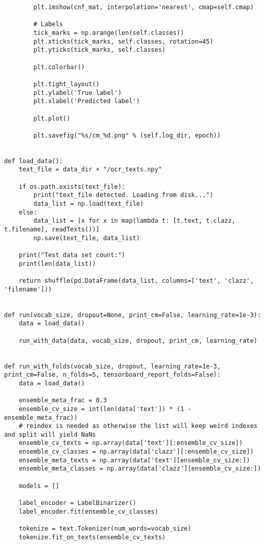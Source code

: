 \begin{verbatim}
        plt.imshow(cnf_mat, interpolation='nearest', cmap=self.cmap)

        # Labels
        tick_marks = np.arange(len(self.classes))
        plt.xticks(tick_marks, self.classes, rotation=45)
        plt.yticks(tick_marks, self.classes)

        plt.colorbar()

        plt.tight_layout()
        plt.ylabel('True label')
        plt.xlabel('Predicted label')

        plt.plot()

        plt.savefig("%s/cm_%d.png" % (self.log_dir, epoch))


def load_data():
    text_file = data_dir + "/ocr_texts.npy"

    if os.path.exists(text_file):
        print("text_file detected. Loading from disk...")
        data_list = np.load(text_file)
    else:
        data_list = [x for x in map(lambda t: [t.text, t.clazz, t.filename], readTexts())]
        np.save(text_file, data_list)

    print("Test data set count:")
    print(len(data_list))

    return shuffle(pd.DataFrame(data_list, columns=['text', 'clazz', 'filename']))


def run(vocab_size, dropout=None, print_cm=False, learning_rate=1e-3):
    data = load_data()

    run_with_data(data, vocab_size, dropout, print_cm, learning_rate)


def run_with_folds(vocab_size, dropout, learning_rate=1e-3, print_cm=False, n_folds=5, tensorboard_report_folds=False):
    data = load_data()

    ensemble_meta_frac = 0.3
    ensemble_cv_size = int(len(data['text']) * (1 - ensemble_meta_frac))
    # reindex is needed as otherwise the list will keep weird indexes and split will yield NaNs
    ensemble_cv_texts = np.array(data['text'][:ensemble_cv_size])
    ensemble_cv_classes = np.array(data['clazz'][:ensemble_cv_size])
    ensemble_meta_texts = np.array(data['text'][ensemble_cv_size:])
    ensemble_meta_classes = np.array(data['clazz'][ensemble_cv_size:])

    models = []

    label_encoder = LabelBinarizer()
    label_encoder.fit(ensemble_cv_classes)

    tokenize = text.Tokenizer(num_words=vocab_size)
    tokenize.fit_on_texts(ensemble_cv_texts)


\end{verbatim}
